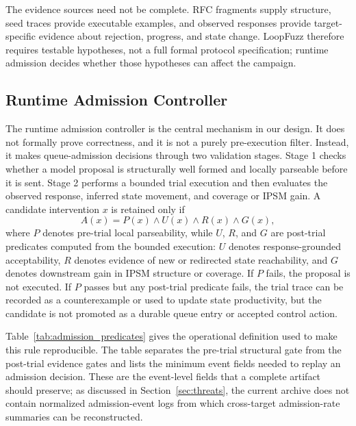 \documentclass[final,5p,times,number]{elsarticle}
\begin{document}
The evidence sources need not be complete. RFC fragments supply structure, seed traces provide executable examples, and observed responses provide target-specific evidence about rejection, progress, and state change. LoopFuzz therefore requires testable hypotheses, not a full formal protocol specification; runtime admission decides whether those hypotheses can affect the campaign.

\subsection{Runtime Admission Controller}
The runtime admission controller is the central mechanism in our design. It does not formally prove correctness, and it is not a purely pre-execution filter. Instead, it makes queue-admission decisions through two validation stages. Stage 1 checks whether a model proposal is structurally well formed and locally parseable before it is sent. Stage 2 performs a bounded trial execution and then evaluates the observed response, inferred state movement, and coverage or IPSM gain. A candidate intervention $x$ is retained only if
\[
A(x)=P(x) \land U(x) \land R(x) \land G(x),
\]
where $P$ denotes pre-trial local parseability, while $U$, $R$, and $G$ are post-trial predicates computed from the bounded execution: $U$ denotes response-grounded acceptability, $R$ denotes evidence of new or redirected state reachability, and $G$ denotes downstream gain in IPSM structure or coverage. If $P$ fails, the proposal is not executed. If $P$ passes but any post-trial predicate fails, the trial trace can be recorded as a counterexample or used to update state productivity, but the candidate is not promoted as a durable queue entry or accepted control action.

Table~\ref{tab:admission_predicates} gives the operational definition used to make this rule reproducible. The table separates the pre-trial structural gate from the post-trial evidence gates and lists the minimum event fields needed to replay an admission decision. These are the event-level fields that a complete artifact should preserve; as discussed in Section~\ref{sec:threats}, the current archive does not contain normalized admission-event logs from which cross-target admission-rate summaries can be reconstructed.
\end{document}
